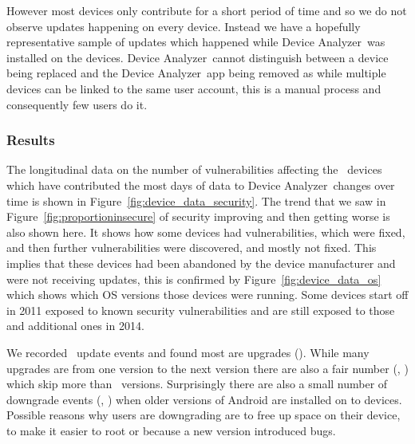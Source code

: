 \documentclass{llncs}
\newcommand{\da}{Device Analyzer}
\begin{document}
However most devices only contribute for a short period of time and so we do not observe updates happening on every device.
Instead we have a hopefully representative sample of updates which happened while \da\ was installed on the devices.
\da\ cannot distinguish between a device being replaced and the \da\ app being removed as while multiple devices can be linked to the same user account, this is a manual process and consequently few users do it.


\subsubsection{Results}

The longitudinal data on the number of vulnerabilities affecting the \daNumDeviceDataDevices\ devices which have contributed the most days of data to \da\ changes over time is shown in Figure~\ref{fig:device_data_security}.
The trend that we saw in Figure~\ref{fig:proportioninsecure} of security improving and then getting worse is also shown here.
It shows how some devices had vulnerabilities, which were fixed, and then further vulnerabilities were discovered, and mostly not fixed.
This implies that these devices had been abandoned by the device manufacturer and were not receiving updates, this is confirmed by Figure~\ref{fig:device_data_os} which shows which OS versions those devices were running.
Some devices start off in 2011 exposed to known security vulnerabilities and are still exposed to those and additional ones in 2014.

We recorded \daNumFullVersionUpdates\ update events and found most are upgrades (\daNumUpdatesUpgrades).
While many upgrades are from one version to the next version there are also a fair number (\daNumUpdatesBigUpgrades, \daPercBigUpgradesNominal) which skip more than \daNumUpdatesSkippedBig\ versions.
Surprisingly there are also a small number of downgrade events (\daNumUpdatesDowngrades, \daPercUpdatesDowngradesNominal) when older versions of Android are installed on to devices.
Possible reasons why users are downgrading are to free up space on their device, to make it easier to root or because a new version introduced bugs.

\end{document}

